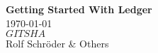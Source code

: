 
\begin{titlepage}
\vspace*{10 mm} %
\begin{center}
{\Huge\bfseries Getting Started With Ledger}\\
\vspace{50mm}
\today \leavevmode \\
$GITSHA$ \\
\vspace{\fill}
Rolf Schr\"oder \& Others
\end{center}
\end{titlepage}
